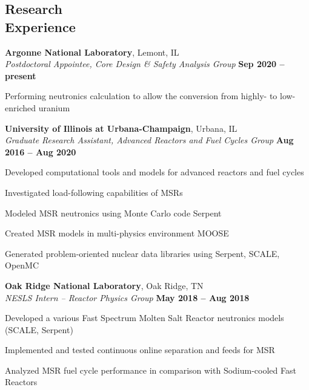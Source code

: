 \documentclass[margin,line]{resume}
\begin{document}
\begin{resume}
    \section{\mysidestyle Research\\Experience}               
    \textbf{Argonne National Laboratory}, Lemont, IL\\
		\textsl{Postdoctoral Appointee, Core Design \& Safety Analysis Group} 
		\hfill \textbf{Sep 2020 -- present}\\
\vspace{-4mm}\begin{list2}
	\item Performing neutronics calculation to allow the conversion from 
	highly- to low-enriched uranium
\end{list2}

    \textbf{University of Illinois at Urbana-Champaign}, Urbana, IL\\
		\textsl{Graduate Research Assistant, Advanced Reactors and Fuel Cycles 
		Group} \hfill \textbf{Aug 2016 -- Aug 2020}\\
                \vspace{-4mm}\begin{list2}
                \item Developed computational tools and models for advanced 
                reactors and fuel cycles
                \item Investigated load-following capabilities of MSRs
                \item Modeled MSR neutronics using Monte Carlo code 
                Serpent
				\item Created MSR models in multi-physics environment MOOSE
				\item Generated problem-oriented nuclear data libraries using 
				Serpent, SCALE, OpenMC
                \end{list2}

    \textbf{Oak Ridge National Laboratory}, Oak Ridge, TN\\
		\textsl{NESLS Intern -- Reactor Physics Group} \hfill \textbf{May 2018 
		-- Aug 2018}\\
                \vspace{-4mm}\begin{list2}
                \item Developed a various Fast Spectrum Molten Salt Reactor 
                neutronics models (SCALE, Serpent)
				\item Implemented and tested continuous online separation and 
				feeds for MSR
				\item Analyzed MSR fuel cycle performance in comparison with 
				Sodium-cooled Fast Reactors
                \end{list2}


\end{resume}
\end{document}
